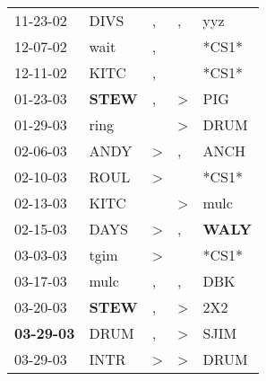 \begin{supertabular}{p{0.07\textwidth}p{0.06\textwidth}p{0.02\textwidth}p{0.02\textwidth}p{0.06\textwidth}}
          11-23-02\textsuperscript{} &           DIVS\textsuperscript{} &                , &                , &            yyz\textsuperscript{} \\
          12-07-02\textsuperscript{} &           wait\textsuperscript{} &                , &                  &                            *CS1* \\
          12-11-02\textsuperscript{} &           KITC\textsuperscript{} &                , &                  &                            *CS1* \\
          01-23-03\textsuperscript{} &  \textbf{STEW\textsuperscript{}} &                , &     \textgreater &            PIG\textsuperscript{} \\
          01-29-03\textsuperscript{} &           ring\textsuperscript{} &                  &     \textgreater &           DRUM\textsuperscript{} \\
          02-06-03\textsuperscript{} &           ANDY\textsuperscript{} &     \textgreater &                , &           ANCH\textsuperscript{} \\
          02-10-03\textsuperscript{} &           ROUL\textsuperscript{} &     \textgreater &                  &                            *CS1* \\
          02-13-03\textsuperscript{} &           KITC\textsuperscript{} &                  &     \textgreater &           mulc\textsuperscript{} \\
          02-15-03\textsuperscript{} &           DAYS\textsuperscript{} &     \textgreater &                , &  \textbf{WALY\textsuperscript{}} \\
          03-03-03\textsuperscript{} &           tgim\textsuperscript{} &     \textgreater &                  &                            *CS1* \\
          03-17-03\textsuperscript{} &           mulc\textsuperscript{} &                , &                , &            DBK\textsuperscript{} \\
          03-20-03\textsuperscript{} &  \textbf{STEW\textsuperscript{}} &                , &     \textgreater &            2X2\textsuperscript{} \\
 \textbf{03-29-03\textsuperscript{}} &           DRUM\textsuperscript{} &                , &     \textgreater &           SJIM\textsuperscript{} \\
          03-29-03\textsuperscript{} &           INTR\textsuperscript{} &     \textgreater &     \textgreater &           DRUM\textsuperscript{} \\

\end{supertabular}
